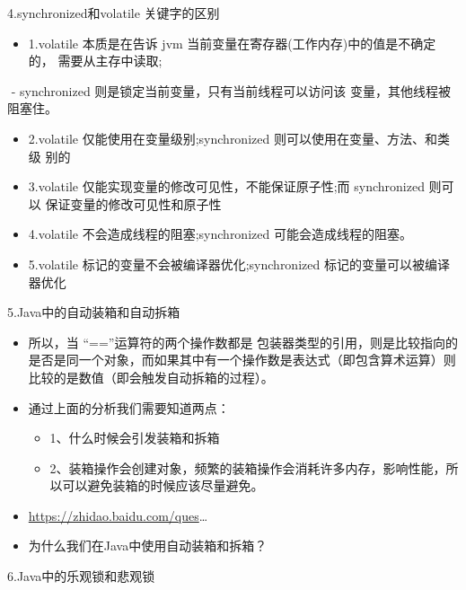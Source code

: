 \documentclass[9pt, b5paper]{article}
\begin{document}
4.synchronized和volatile 关键字的区别
\begin{itemize}
\item 1.volatile 本质是在告诉 jvm 当前变量在寄存器(工作内存)中的值是不确定的， 需要从主存中读取;
\end{itemize}
​  - synchronized 则是锁定当前变量，只有当前线程可以访问该 变量，其他线程被阻塞住。
\begin{itemize}
\item 2.volatile 仅能使用在变量级别;synchronized 则可以使用在变量、方法、和类级 别的
\item 3.volatile 仅能实现变量的修改可见性，不能保证原子性;而 synchronized 则可以 保证变量的修改可见性和原子性
\item 4.volatile 不会造成线程的阻塞;synchronized 可能会造成线程的阻塞。
\item 5.volatile 标记的变量不会被编译器优化;synchronized 标记的变量可以被编译器优化
\end{itemize}
5.Java中的自动装箱和自动拆箱
\begin{itemize}
\item 所以，当 “==”运算符的两个操作数都是 包装器类型的引用，则是比较指向的是否是同一个对象，而如果其中有一个操作数是表达式（即包含算术运算）则比较的是数值（即会触发自动拆箱的过程）。
\item 通过上面的分析我们需要知道两点：
\begin{itemize}
\item 1、什么时候会引发装箱和拆箱
\item 2、装箱操作会创建对象，频繁的装箱操作会消耗许多内存，影响性能，所以可以避免装箱的时候应该尽量避免。
\end{itemize}
\item \url{https://zhidao.baidu.com/ques}\ldots{}
\item 为什么我们在Java中使用自动装箱和拆箱？
\end{itemize}
6.Java中的乐观锁和悲观锁
\end{document}
